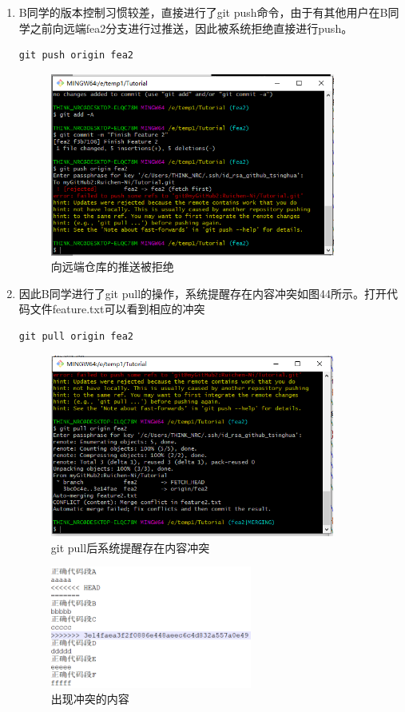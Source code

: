 \documentclass[a4paper,14pt]{article}
\begin{document}
\begin{enumerate}[1. ]
\newpage
\item B同学的版本控制习惯较差，直接进行了git push命令，由于有其他用户在B同学之前向远端fea2分支进行过推送，因此被系统拒绝直接进行push。
{\color{red}
\begin{lstlisting}[language=C]
git push origin fea2
\end{lstlisting}
}
\begin{figure}[h]
\centering
\includegraphics[height=6cm]{figure/stepB11}
\caption{向远端仓库的推送被拒绝}
\end{figure}

\item 因此B同学进行了git pull的操作，系统提醒存在内容冲突如图44所示。打开代码文件feature.txt可以看到相应的冲突
{\color{red}
\begin{lstlisting}[language=C]
git pull origin fea2
\end{lstlisting}
}
\begin{figure}[h]
\centering
\includegraphics[height=6cm]{figure/stepB12}
\caption{git pull后系统提醒存在内容冲突}
\end{figure}
\begin{figure}[h]
\centering
\includegraphics[height=4cm]{figure/stepB13}
\caption{出现冲突的内容}
\end{figure}


\end{enumerate}
\end{document}
